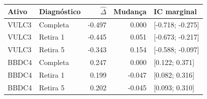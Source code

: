 \begin{tabular}{llrrl}
\toprule
Ativo & Diagnóstico & $\widehat\Delta$ & Mudança & IC marginal\\
\midrule
VULC3 & Completa & -0.497 & 0.000 & [-0.718; -0.275]\\
VULC3 & Retira 1 & -0.445 & 0.051 & [-0.673; -0.217]\\
VULC3 & Retira 5 & -0.343 & 0.154 & [-0.588; -0.097]\\
BBDC4 & Completa & 0.247 & 0.000 & [0.122; 0.371]\\
BBDC4 & Retira 1 & 0.199 & -0.047 & [0.082; 0.316]\\
BBDC4 & Retira 5 & 0.202 & -0.045 & [0.093; 0.310]\\
\bottomrule
\end{tabular}
